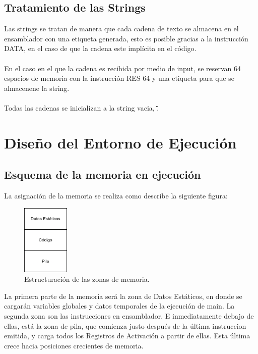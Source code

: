 \documentclass{article}[a4paper]
\begin{document}
\subsection{Tratamiento de las Strings}
Las strings se tratan de manera que cada cadena de texto se almacena en el ensamblador con una etiqueta generada, esto es posible gracias a la instrucción DATA, en el caso de que la cadena este implícita en el código. \\ \\
En el caso en el que la cadena es recibida por medio de input, se reservan 64 espacios de memoria con la instrucción RES 64 y una etiqueta para que se almacenene la string. \\ \\
Todas las cadenas se inicializan a la string vacia, \"\".

\section{Diseño del Entorno de Ejecución}

\subsection{Esquema de la memoria en ejecución}
La asignación de la memoria se realiza como describe la siguiente figura:\\

\begin{figure}[h!]
\centering
\includegraphics[width=0.2\textwidth]{EE.png}
\caption{\label{figura:EE}Estructuración de las zonas de memoria.}
\end{figure}

La primera parte de la memoria será la zona de Datos Estáticos, en donde se cargarán variables globales y datos temporales de la ejecución de main. La segunda zona son las instrucciones en ensamblador. E inmediatamente debajo de ellas, está la zona de pila, que comienza justo después de la última instruccion emitida, y carga todos los Registros de Activación a partir de ellas. Esta última crece hacia posiciones crecientes de memoria.\\
\end{document}
